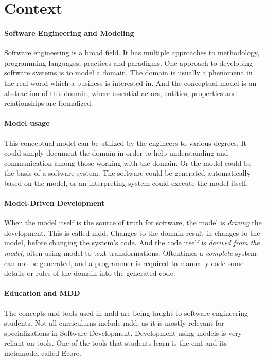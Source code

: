 \section{Context}

\paragraph*{Software Engineering and Modeling}
Software engineering is a broad field. It has multiple approaches to methodology, programming languages, practices and paradigms.
One approach to developing software systems is to model a domain.
The domain is usually a phenomena in the real world which a business is interested in. And the conceptual model is an abstraction of this domain, where essential actors, entities, properties and relationships are formalized.

\paragraph*{Model usage}
This conceptual model can be utilized by the engineers to various degrees.
It could simply document the domain in order to help understanding and communication among those working with the domain. Or the model could be the basis of a software system. The software could be generated automatically based on the model, or an interpreting system could execute the model itself.

\paragraph*{Model-Driven Development}
When the model itself is the source of truth for software, the model is \textit{driving} the development. This is called \acrfull{mdd}. Changes to the domain result in changes to the model, before changing the system's code. And the code itself is \textit{derived from the model}, often using model-to-text transformations. Oftentimes a \textit{complete} system can not be generated, and a programmer is required to manually code some details or rules of the domain into the generated code.

\paragraph*{Education and MDD}
The concepts and tools used in \acrshort{mdd} are being taught to software engineering students.
Not all curriculums include \acrshort{mdd}, as it is mostly relevant for specializations in Software Development. %
Development using models is very reliant on tools. One of the tools that students learn is the \acrfull{emf} and its \gls{metamodel} called \gls{Ecore}.

